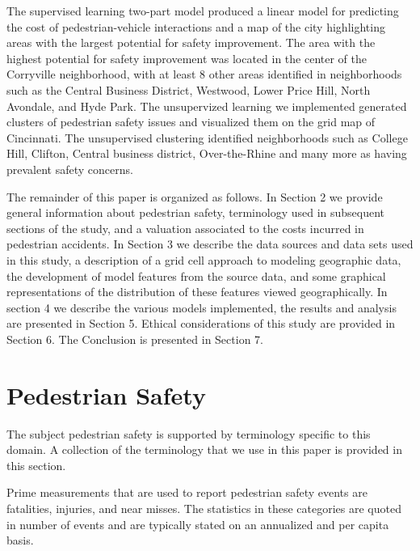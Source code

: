 \documentclass{llncs}
\begin{document}
The supervised learning two-part model produced a linear model for predicting the cost of pedestrian-vehicle interactions and a map of the city highlighting areas with the largest potential for safety improvement. The area with the highest potential for safety improvement was located in the center of the Corryville neighborhood, with at least 8 other areas identified in neighborhoods such as the Central Business District, Westwood, Lower Price Hill, North Avondale, and Hyde Park.
The unsupervized learning we implemented generated clusters of pedestrian safety issues and visualized them on the grid map of Cincinnati. The unsupervised clustering identified neighborhoods such as College Hill, Clifton, Central business district, Over-the-Rhine and many more as having prevalent safety concerns.

The remainder of this paper is organized as follows. In Section 2 we provide general information about pedestrian safety, terminology used in subsequent sections of the study, and a valuation associated to the costs incurred in pedestrian accidents. In Section 3 we describe the data sources and data sets used in this study, a description of a grid cell approach to modeling geographic data, the development of model features from the source data, and some graphical representations of the distribution of these features viewed geographically. In section 4 we describe the various models implemented, the results and analysis are presented in Section 5. Ethical considerations of this study are provided in Section 6. The Conclusion is presented in Section 7. 

\section{Pedestrian Safety}
%
The subject pedestrian safety is supported by terminology specific to this domain. A collection of the terminology that we use in this paper is provided in this section. 

Prime measurements that are used to report pedestrian safety events are fatalities, injuries, and near misses. The statistics in these categories are quoted in number of events and are typically stated on an annualized and per capita basis.
\end{document}
